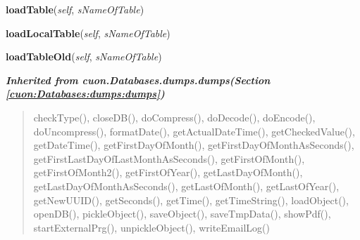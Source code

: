     \vspace{0.5ex}

\hspace{.8\funcindent}\begin{boxedminipage}{\funcwidth}

    \raggedright \textbf{loadTable}(\textit{self}, \textit{sNameOfTable})

\setlength{\parskip}{2ex}
\setlength{\parskip}{1ex}
    \end{boxedminipage}

    \label{cuon:Databases:cyr_load_table:cyr_load_table:loadLocalTable}

    \vspace{0.5ex}

\hspace{.8\funcindent}\begin{boxedminipage}{\funcwidth}

    \raggedright \textbf{loadLocalTable}(\textit{self}, \textit{sNameOfTable})

\setlength{\parskip}{2ex}
\setlength{\parskip}{1ex}
    \end{boxedminipage}

    \label{cuon:Databases:cyr_load_table:cyr_load_table:loadTableOld}

    \vspace{0.5ex}

\hspace{.8\funcindent}\begin{boxedminipage}{\funcwidth}

    \raggedright \textbf{loadTableOld}(\textit{self}, \textit{sNameOfTable})

\setlength{\parskip}{2ex}
\setlength{\parskip}{1ex}
    \end{boxedminipage}


\large{\textbf{\textit{Inherited from cuon.Databases.dumps.dumps\textit{(Section \ref{cuon:Databases:dumps:dumps})}}}}

\begin{quote}
checkType(), closeDB(), doCompress(), doDecode(), doEncode(), doUncompress(), formatDate(), getActualDateTime(), getCheckedValue(), getDateTime(), getFirstDayOfMonth(), getFirstDayOfMonthAsSeconds(), getFirstLastDayOfLastMonthAsSeconds(), getFirstOfMonth(), getFirstOfMonth2(), getFirstOfYear(), getLastDayOfMonth(), getLastDayOfMonthAsSeconds(), getLastOfMonth(), getLastOfYear(), getNewUUID(), getSeconds(), getTime(), getTimeString(), loadObject(), openDB(), pickleObject(), saveObject(), saveTmpData(), showPdf(), startExternalPrg(), unpickleObject(), writeEmailLog()
\end{quote}

